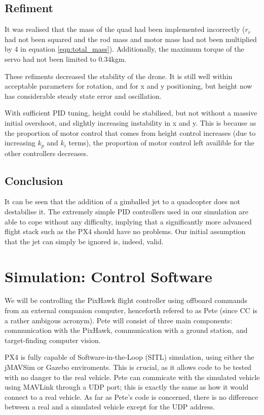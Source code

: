\documentclass[10pt]{article}
\begin{document}
\newpage

\subsection{Refiment}
It was realised that the mass of the quad had been implemented incorrectly ($r_r$ had not been squared and the rod mass and motor mass had not been multiplied by 4 in equation \ref{eqn:total_mass}). Additionally, the maximum torque of the servo had not been limited to 0.34kgm.

These refiments decreased the stability of the drone. It is still well within acceptable parameters for rotation, and for x and y positioning, but height now has considerable steady state error and oscillation.

With sufficient PID tuning, height could be stabilised, but not without a massive initial overshoot, and slightly increasing instability in x and y. This is because as the proportion of motor control that comes from height control increases (due to increasing $k_p$ and $k_i$ terms), the proportion of motor control left availible for the other controllers decreases.

\subsection{Conclusion}
It can be seen that the addition of a gimballed jet to a quadcopter does not destabilise it. The extremely simple PID controllers used in our simulation are able to cope without any difficulty, implying that a significantly more advanced flight stack such as the PX4 should have no problems. Our initial assumption that the jet can simply be ignored is, indeed, valid.

\section{Simulation: Control Software}
We will be controlling the PixHawk flight controller using offboard commands from an external companion computer, henceforth refered to as Pete (since CC is a rather ambigous acronym). Pete will consist of three main components: communication with the PixHawk, communication with a ground station, and target-finding computer vision.

PX4 is fully capable of Software-in-the-Loop (SITL) simulation, using either the jMAVSim or Gazebo enviroments. This is crucial, as it allows code to be tested with no danger to the real vehicle. Pete can commicate with the simulated vehicle using MAVLink through a UDP port; this is exactly the same as how it would connect to a real vehicle. As far as Pete's code is concerned, there is no difference between a real and a simulated vehicle except for the UDP address.
\end{document}
